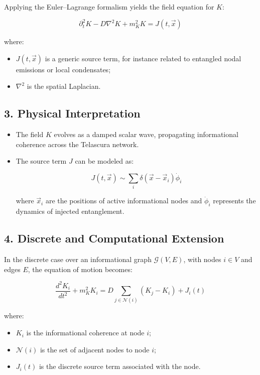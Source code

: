 \documentclass[12pt]{article}
\begin{document}
Applying the Euler–Lagrange formalism yields the field equation for $K$:

\begin{equation}
\partial_t^2 K - D \nabla^2 K + m_K^2 K = J(t, \vec{x})
\end{equation}

where:

\begin{itemize}
  \item $J(t, \vec{x})$ is a generic source term, for instance related to entangled nodal emissions or local condensates;
  \item $\nabla^2$ is the spatial Laplacian.
\end{itemize}

\subsection*{3. Physical Interpretation}

\begin{itemize}
  \item The field $K$ evolves as a damped scalar wave, propagating informational coherence across the Telascura network.
  \item The source term $J$ can be modeled as:

  \begin{equation}
  J(t, \vec{x}) \sim \sum_i \delta(\vec{x} - \vec{x}_i) \dot{\phi}_i
  \end{equation}

  where $\vec{x}_i$ are the positions of active informational nodes and $\dot{\phi}_i$ represents the dynamics of injected entanglement.
\end{itemize}

\subsection*{4. Discrete and Computational Extension}

In the discrete case over an informational graph $\mathcal{G}(V, E)$, with nodes $i \in V$ and edges $E$, the equation of motion becomes:

\begin{equation}
\frac{d^2 K_i}{dt^2} + m_K^2 K_i = D \sum_{j \in \mathcal{N}(i)} (K_j - K_i) + J_i(t)
\end{equation}

where:

\begin{itemize}
  \item $K_i$ is the informational coherence at node $i$;
  \item $\mathcal{N}(i)$ is the set of adjacent nodes to node $i$;
  \item $J_i(t)$ is the discrete source term associated with the node.
\end{itemize}
\end{document}
